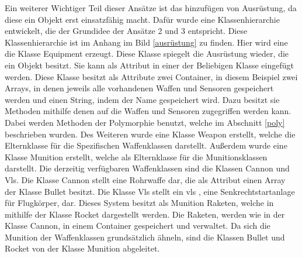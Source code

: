 Ein weiterer Wichtiger Teil dieser Ansätze ist das hinzufügen von Ausrüstung, da diese ein Objekt erst einsatzfähig macht. Dafür wurde eine Klassenhierarchie entwickelt, die der Grundidee der Ansätze 2 und 3 entspricht. Diese Klassenhierarchie ist im Anhang im Bild \ref{ausrüstung} zu finden. Hier wird eine die Klasse \glqq Equipment\grqq{} erzeugt. Diese Klasse spiegelt die Ausrüstung wieder, die ein Objekt besitzt. Sie kann als Attribut in einer der Beliebigen Klasse eingefügt werden.   Diese Klasse besitzt als Attribute zwei Container, in diesem Beispiel zwei Arrays, in denen jeweils alle vorhandenen Waffen und Sensoren gespeichert werden und einen String, indem der Name gespeichert wird.  Dazu besitzt sie Methoden mithilfe denen auf die Waffen und Sensoren zugegriffen werden kann. Dabei werden Methoden der Polymorphie benutzt, welche im Abschnitt  \ref{poly} beschrieben wurden. Des Weiteren wurde eine Klasse \glqq Weapon\grqq{} erstellt, welche die Elternklasse für die Spezifischen Waffenklassen darstellt. Außerdem wurde eine Klasse \glqq Munition\grqq{} erstellt, welche als Elternklasse für die Munitionsklassen darstellt. Die derzeitig verfügbaren Waffenklassen sind die Klassen \glqq Cannon\grqq{} und \glqq Vls\grqq{}. Die Klasse \glqq Cannon\grqq{} stellt eine Rohrwaffe dar, die als Attribut einen Array der Klasse  \glqq Bullet\grqq{} besitzt. Die Klasse \glqq Vls\grqq{} stellt ein  \ac{vls} , eine Senkrechtstartanlage für Flugkörper, dar. Dieses System besitzt als Munition Raketen, welche in mithilfe der Klasse \glqq Rocket\grqq{} dargestellt werden.  Die Raketen, werden wie in der Klasse \glqq Cannon\grqq{}, in einem Container gespeichert und verwaltet. Da sich die Munition der Waffenklassen grundsätzlich ähneln, sind die Klassen \glqq Bullet\grqq{} und  \glqq Rocket\grqq{}  von der Klasse  \glqq Munition\grqq{} abgeleitet.
 

